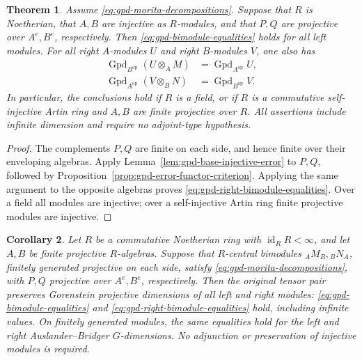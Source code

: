\documentclass[12pt,a4paper,english,reqno]{amsart}
\numberwithin{equation}{section}
\theoremstyle{plain}
\newtheorem{theorem}{Theorem}[section]
\newtheorem{corollary}[theorem]{Corollary}
\theoremstyle{definition}
\begin{document}
\begin{theorem}
\label{thm:gpd-base-injective-semt}
Assume \eqref{eq:gpd-morita-decompositions}.  Suppose that $R$ is
Noetherian, that $A,B$ are injective as $R$-modules, and that $P,Q$
are projective over $A^e,B^e$, respectively.  Then
\eqref{eq:gpd-bimodule-equalities} holds for all left modules.
For all right $A$-modules $U$ and right $B$-modules $V$, one also has
\begin{equation}
 \begin{aligned}
 \operatorname{Gpd}_{B^{\mathrm{op}}}(U\otimes_AM)
   &=\operatorname{Gpd}_{A^{\mathrm{op}}}U,\\
 \operatorname{Gpd}_{A^{\mathrm{op}}}(V\otimes_BN)
   &=\operatorname{Gpd}_{B^{\mathrm{op}}}V.
 \end{aligned}
 \label{eq:gpd-right-bimodule-equalities}
\end{equation}
In particular, the conclusions hold if $R$ is a field, or if $R$ is
a commutative self-injective Artin ring and $A,B$ are finite
projective over $R$.  All assertions include infinite dimension and
require no adjoint-type hypothesis.
\end{theorem}

\begin{proof}
The complements $P,Q$ are finite on each side, and hence finite over
their enveloping algebras.  Apply
Lemma~\ref{lem:gpd-base-injective-error} to $P,Q$, followed by
Proposition~\ref{prop:gpd-error-functor-criterion}.  Applying the same
argument to the opposite algebras proves
\eqref{eq:gpd-right-bimodule-equalities}.  Over a field all modules
are injective; over a self-injective Artin ring finite projective
modules are injective.
\end{proof}

\begin{corollary}
\label{cor:gpd-gorenstein-noetherian-base}
Let $R$ be a commutative Noetherian ring with
$\operatorname{id}_R R<\infty$, and let $A,B$ be finite projective
$R$-algebras.  Suppose that $R$-central bimodules
$ {}_AM_B,{}_BN_A$, finitely generated projective on each side, satisfy
\eqref{eq:gpd-morita-decompositions}, with $P,Q$ projective over
$A^e,B^e$, respectively.  Then the original tensor pair preserves
Gorenstein projective dimensions of all left and right modules:
\eqref{eq:gpd-bimodule-equalities} and
\eqref{eq:gpd-right-bimodule-equalities} hold, including infinite
values.  On finitely generated modules, the same equalities hold
for the left and right Auslander--Bridger $G$-dimensions.
No adjunction or preservation of injective modules is required.
\end{corollary}
\end{document}
